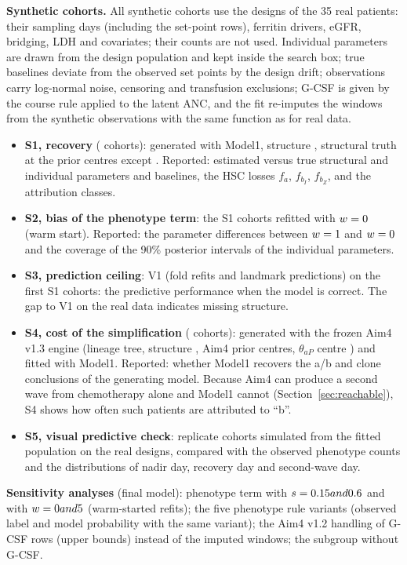 \documentclass[11pt]{article}
\begin{document}
\textbf{Synthetic cohorts.} All synthetic cohorts use the designs of the 35 real patients: their sampling days (including the set-point rows), ferritin drivers, eGFR, bridging, LDH and covariates; their counts are not used. Individual parameters are drawn from the design population and kept inside the search box; true baselines deviate from the observed set points by the design drift; observations carry log-normal noise, censoring and transfusion exclusions; G-CSF is given by the course rule applied to the latent ANC, and the fit re-imputes the windows from the synthetic observations with the same function as for real data.
\begin{itemize}
\item \textbf{S1, recovery} (\valSone{} cohorts): generated with Model1, structure \texttt{\valSoneModel}, structural truth at the prior centres except \valSoneTruth. Reported: estimated versus true structural and individual parameters and baselines, the HSC losses $f_a$, $f_{b_I}$, $f_{b_Z}$, and the attribution classes.
\item \textbf{S2, bias of the phenotype term}: the S1 cohorts refitted with $w=0$ (warm start). Reported: the parameter differences between $w=1$ and $w=0$ and the coverage of the 90\% posterior intervals of the individual parameters.
\item \textbf{S3, prediction ceiling}: V1 (fold refits and landmark predictions) on the first \valSthree{} S1 cohorts: the predictive performance when the model is correct. The gap to V1 on the real data indicates missing structure.
\item \textbf{S4, cost of the simplification} (\valSfour{} cohorts): generated with the frozen Aim4 v1.3 engine (lineage tree, structure \texttt{\valSfourModel}, Aim4 prior centres, $\theta_{aP}$ centre \valThapAimFour) and fitted with Model1. Reported: whether Model1 recovers the a/b and clone conclusions of the generating model. Because Aim4 can produce a second wave from chemotherapy alone and Model1 cannot (Section~\ref{sec:reachable}), S4 shows how often such patients are attributed to ``b''.
\item \textbf{S5, visual predictive check}: \valSfive{} replicate cohorts simulated from the fitted population on the real designs, compared with the observed phenotype counts and the distributions of nadir day, recovery day and second-wave day.
\end{itemize}

\textbf{Sensitivity analyses} (final model): phenotype term with $s=0.15 and 0.6$ and with $w=0 and 5$ (warm-started refits); the five phenotype rule variants (observed label and model probability with the same variant); the Aim4 v1.2 handling of G-CSF rows (upper bounds) instead of the imputed windows; the subgroup without G-CSF.
\end{document}
